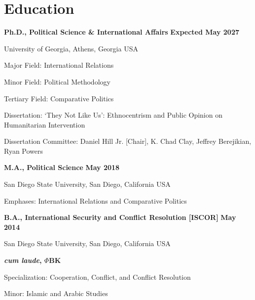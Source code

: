 \documentclass[letterpaper,12pt]{article}
\newenvironment{list1}{
  \begin{list}{}{
      \setlength{\itemsep}{0in}
      \setlength{\parsep}{0in} \setlength{\parskip}{0in}
      \setlength{\topsep}{0in} \setlength{\partopsep}{0in} 
      \setlength{\leftmargin}{0in}}}{\end{list}}
\begin{document}
\section{Education}
{\bf Ph.D., Political Science \& International Affairs} \hfill {\bf Expected May 2027}
\begin{list1} 
\item University of Georgia, Athens, Georgia USA
\item Major Field: International Relations
\item Minor Field: Political Methodology
\item Tertiary Field: Comparative Politics
\item Dissertation: `They Not Like Us': Ethnocentrism and Public Opinion on Humanitarian Intervention
\item Dissertation Committee:  Daniel Hill Jr. [Chair], K. Chad Clay, Jeffrey Berejikian, Ryan Powers
\end{list1}
\par
{\bf M.A., Political Science} \hfill {\bf May 2018}
\begin{list1} 
\item San Diego State University, San Diego, California USA
\item Emphases: International Relations and Comparative Politics
\end{list1}
\par
{\bf B.A., International Security and Conflict Resolution [ISCOR]} \hfill {\bf May 2014}
\begin{list1} 
\item San Diego State University, San Diego, California USA
\item \textbf{\textit{cum laude}, $\Phi$BK}
\item Specialization: Cooperation, Conflict, and Conflict Resolution
\item Minor: Islamic and Arabic Studies
\end{list1}

\end{document}
